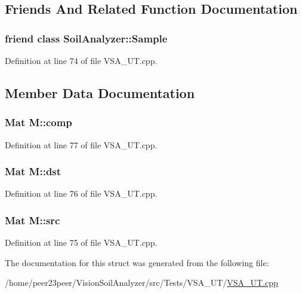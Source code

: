 \subsection{Friends And Related Function Documentation}
\hypertarget{struct_m_a83d1981518b48903f64d0e6333f5a0c0}{}
\subsubsection[{Soil\+Analyzer\+::\+Sample}]{\setlength{\rightskip}{0pt plus 5cm}friend class {\bf Soil\+Analyzer\+::\+Sample}\hspace{0.3cm}{\ttfamily [friend]}}\label{struct_m_a83d1981518b48903f64d0e6333f5a0c0}


Definition at line 74 of file V\+S\+A\+\_\+\+U\+T.\+cpp.



\subsection{Member Data Documentation}
\hypertarget{struct_m_aea135e95a654e5a8fff759cd5c104405}{}
\subsubsection[{comp}]{\setlength{\rightskip}{0pt plus 5cm}Mat M\+::comp}\label{struct_m_aea135e95a654e5a8fff759cd5c104405}


Definition at line 77 of file V\+S\+A\+\_\+\+U\+T.\+cpp.

\hypertarget{struct_m_a08a6e094da4841420fd9489705ecb7a3}{}
\subsubsection[{dst}]{\setlength{\rightskip}{0pt plus 5cm}Mat M\+::dst}\label{struct_m_a08a6e094da4841420fd9489705ecb7a3}


Definition at line 76 of file V\+S\+A\+\_\+\+U\+T.\+cpp.

\hypertarget{struct_m_ae37eecb837e8d52a27330268e4b12a34}{}
\subsubsection[{src}]{\setlength{\rightskip}{0pt plus 5cm}Mat M\+::src}\label{struct_m_ae37eecb837e8d52a27330268e4b12a34}


Definition at line 75 of file V\+S\+A\+\_\+\+U\+T.\+cpp.



The documentation for this struct was generated from the following file\+:\begin{DoxyCompactItemize}
\item 
/home/peer23peer/\+Vision\+Soil\+Analyzer/src/\+Tests/\+V\+S\+A\+\_\+\+U\+T/\hyperlink{_v_s_a___u_t_8cpp}{V\+S\+A\+\_\+\+U\+T.\+cpp}\end{DoxyCompactItemize}
